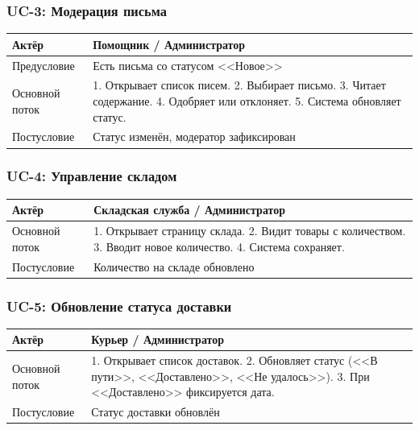 \documentclass[14pt,a4paper]{extarticle}
\begin{document}
\subsubsection{UC-3: Модерация письма}

\begin{table}[H]
\centering
\small
\begin{tabular}{|L{3cm}|L{10cm}|}
\hline
Актёр & Помощник / Администратор \\
\hline
Предусловие & Есть письма со статусом <<Новое>> \\
\hline
Основной поток & 1. Открывает список писем. 2. Выбирает письмо. 3. Читает содержание. 4. Одобряет или отклоняет. 5. Система обновляет статус. \\
\hline
Постусловие & Статус изменён, модератор зафиксирован \\
\hline
\end{tabular}
\end{table}

\subsubsection{UC-4: Управление складом}

\begin{table}[H]
\centering
\small
\begin{tabular}{|L{3cm}|L{10cm}|}
\hline
Актёр & Складская служба / Администратор \\
\hline
Основной поток & 1. Открывает страницу склада. 2. Видит товары с количеством. 3. Вводит новое количество. 4. Система сохраняет. \\
\hline
Постусловие & Количество на складе обновлено \\
\hline
\end{tabular}
\end{table}

\subsubsection{UC-5: Обновление статуса доставки}

\begin{table}[H]
\centering
\small
\begin{tabular}{|L{3cm}|L{10cm}|}
\hline
Актёр & Курьер / Администратор \\
\hline
Основной поток & 1. Открывает список доставок. 2. Обновляет статус (<<В пути>>, <<Доставлено>>, <<Не удалось>>). 3. При <<Доставлено>> фиксируется дата. \\
\hline
Постусловие & Статус доставки обновлён \\
\hline
\end{tabular}
\end{table}
\end{document}
